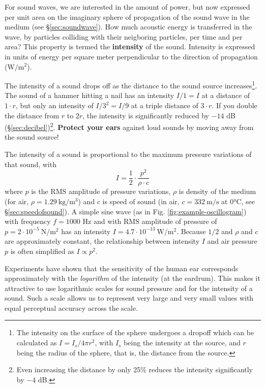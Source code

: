 \documentclass[
]{book}
\begin{document}
For sound waves, we are interested in the amount of power, but now expressed per unit area on the imaginary sphere of propagation of the sound wave in the medium (see §\ref{sec:soundwave}). How much acoustic energy is transferred in the wave, by particles colliding with their neigboring particles, per time and per area? This property is termed the \textbf{intensity} of the sound. Intensity is expressed in units of energy per square meter perpendicular to the direction of propagation (\(\textrm{W}/\textrm{m}^2\)).

The intensity of a sound drops off as the distance to the sound source increases\footnote{The intensity on the surface of the sphere undergoes a dropoff which can be calculated as \(I=I_s/4πr^2\), with \(I_s\) being the intensity at the source, and \(r\) being the radius of the sphere, that is, the distance from the source.}. The sound of a hammer hitting a nail has an intensity \(I/1 = I\) at a distance of \(1 \cdot r\), but only an intensity of \(I /3^2 = I/9\) at a triple distance of \(3 \cdot r\). If you double the distance from \(r\) to \(2r\), the intensity is significantly reduced by \(-14\) dB (§\ref{sec:decibel})\footnote{Even increasing the distance by only 25\% reduces the intensity significantly by \(-4\) dB.}. \textbf{Protect your ears} against loud sounds by moving away from the sound source!

The intensity of a sound is proportional to the maximum pressure variations of that sound, with
\[I = \frac{1}{2} \cdot \frac{p^2}{\rho \cdot c}\]
where \(p\) is the RMS amplitude of pressure variations, \(\rho\) is density of the medium (for air, \(\rho = 1.29\ \textrm{kg}/\textrm{m}^3\)) and \(c\) is speed of sound (in air, \(c = 332\ \textrm{m}/\textrm{s}\) at 0°C, see §\ref{sec:speedofsound}). A simple sine wave (as in Fig. \ref{fig:example-oscillogram}) with frequency \(f=1000\) Hz and with RMS amplitude of pressure of \(p=2 \cdot 10^{-5}\ \textrm{N}/\textrm{m}^2\) has an intensity \(I = 4.7 \cdot 10^{-13}\ \textrm{W}/\textrm{m}^2\).
Because \(1/2\) and \(\rho\) and \(c\) are approximately constant, the relationship between intensity \(I\) and air pressure \(p\) is often simplified as \(I \propto p^2\).

Experiments have shown that the sensitivity of the human ear corresponds approximately with the \emph{logarithm} of the intensity (at the eardrum). This makes it attractive to use logarithmic scales for sound pressure and for the intensity of a sound. Such a scale allows us to represent very large and very small values with equal perceptual accuracy across the scale.
\end{document}
